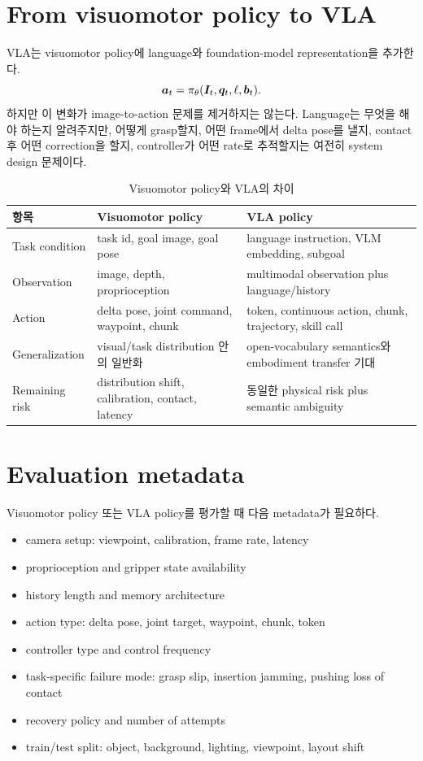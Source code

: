 \section{From visuomotor policy to VLA}

VLA는 visuomotor policy에 language와 foundation-model representation을 추가한다.
\begin{equation}
  \bm{a}_t
  =
  \pi_{\theta}(\bm{I}_t,\bm{q}_t,\ell,\bm{b}_t).
  \label{eq:vla-as-visuomotor}
\end{equation}
하지만 이 변화가 image-to-action 문제를 제거하지는 않는다. Language는 무엇을 해야 하는지 알려주지만, 어떻게 grasp할지, 어떤 frame에서 delta pose를 낼지, contact 후 어떤 correction을 할지, controller가 어떤 rate로 추적할지는 여전히 system design 문제이다.

\begin{table}[ht]
\centering
\caption{Visuomotor policy와 VLA의 차이}
\label{tab:visuomotor-vla}
\small
\begin{tabularx}{\textwidth}{p{30mm}X X}
\toprule
항목 & Visuomotor policy & VLA policy \\
\midrule
Task condition & task id, goal image, goal pose & language instruction, VLM embedding, subgoal \\
Observation & image, depth, proprioception & multimodal observation plus language/history \\
Action & delta pose, joint command, waypoint, chunk & token, continuous action, chunk, trajectory, skill call \\
Generalization & visual/task distribution 안의 일반화 & open-vocabulary semantics와 embodiment transfer 기대 \\
Remaining risk & distribution shift, calibration, contact, latency & 동일한 physical risk plus semantic ambiguity \\
\bottomrule
\end{tabularx}
\end{table}

\section{Evaluation metadata}

Visuomotor policy 또는 VLA policy를 평가할 때 다음 metadata가 필요하다.

\begin{itemize}
  \item camera setup: viewpoint, calibration, frame rate, latency
  \item proprioception and gripper state availability
  \item history length and memory architecture
  \item action type: delta pose, joint target, waypoint, chunk, token
  \item controller type and control frequency
  \item task-specific failure mode: grasp slip, insertion jamming, pushing loss of contact
  \item recovery policy and number of attempts
  \item train/test split: object, background, lighting, viewpoint, layout shift
\end{itemize}

